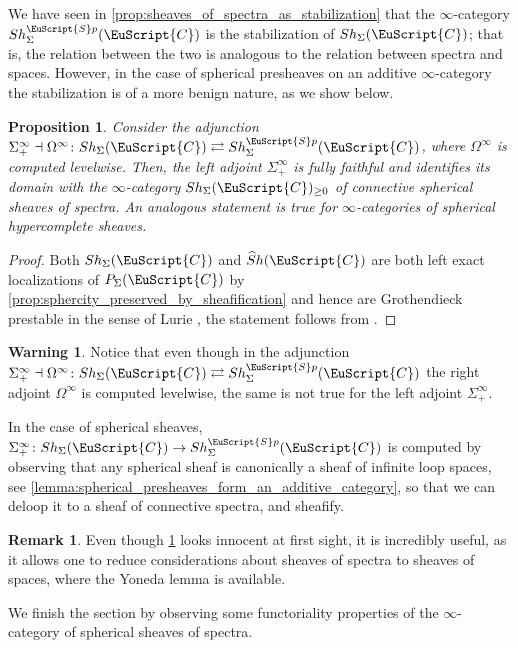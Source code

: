 \documentclass[oneside,a4paper]{amsart}
\newcommand{\euscr}[1]{\EuScript{#1}} %
\newcommand{\ccat}{\euscr{C}} %
\newcommand{\spectra}{\euscr{S}p} %
\newcommand{\hpsheaves}{\widehat{S}h} %
\newcommand{\sigmainfty}{\Sigma^{\infty}_{+}} %
\newcommand{\omegainfty}{\Omega^{\infty}} %
\theoremstyle{plain}
\newtheorem{prop}[thm]{Proposition}
\theoremstyle{definition}
\newtheorem{warning}[thm]{Warning}
\newtheorem{rem}[thm]{Remark}
\theoremstyle{remark}
\begin{document}
We have seen in \cref{prop:sheaves_of_spectra_as_stabilization} that the $\infty$-category $Sh_{\Sigma}^{\spectra}(\ccat)$ is the stabilization of $Sh_{\Sigma}(\ccat)$; that is, the relation between the two is analogous to the relation between spectra and spaces. However, in the case of spherical presheaves on an additive $\infty$-category the stabilization is of a more benign nature, as we show below.

\begin{prop}
\label{prop:spherical_sheaves_canonically_lift_to_sheaves_of_spectra}
Consider the adjunction $\sigmainfty \dashv \omegainfty \colon Sh_{\Sigma}(\ccat) \rightleftarrows Sh_{\Sigma}^{\spectra}(\ccat)$, where $\omegainfty$ is computed levelwise. Then, the left adjoint $\sigmainfty$ is fully faithful and identifies its domain with the $\infty$-category $Sh_{\Sigma}(\ccat)_{\geq 0}$ of connective spherical sheaves of spectra. An analogous statement is true for $\infty$-categories of spherical hypercomplete sheaves. 
\end{prop}

\begin{proof}
Both $Sh_{\Sigma}(\ccat)$ and $\hpsheaves(\ccat)$ are both left exact localizations of $P_{\Sigma}(\ccat)$ by \cref{prop:sphercity_preserved_by_sheafification} and hence are Grothendieck prestable in the sense of Lurie \cite[C.1.5.7, C.2.3.1]{lurie_spectral_algebraic_geometry}, the statement follows from \cite[C.1.2.10]{lurie_spectral_algebraic_geometry}. 
\end{proof}

\begin{warning}
\label{warning:sigma_infty_plus_not_computed_by_levelwise_sigma_infty}
Notice that even though in the adjunction $\sigmainfty \dashv \omegainfty \colon Sh_{\Sigma}(\ccat) \rightleftarrows Sh_{\Sigma}^{\spectra}(\ccat)$ the right adjoint $\omegainfty$ is computed levelwise, the same is not true for the left adjoint $\sigmainfty$.

In the case of spherical sheaves, $\sigmainfty \colon Sh_{\Sigma}(\ccat) \rightarrow Sh_{\Sigma}^{\spectra}(\ccat)$ is computed by observing that any spherical sheaf is canonically a sheaf of infinite loop spaces, see \cref{lemma:spherical_presheaves_form_an_additive_category}, so that we can deloop it to a sheaf of connective spectra, and sheafify.
\end{warning}

\begin{rem}
Even though \cref{prop:spherical_sheaves_canonically_lift_to_sheaves_of_spectra} looks innocent at first sight, it is incredibly useful, as it allows one to reduce considerations about sheaves of spectra to sheaves of spaces, where the Yoneda lemma is available.
\end{rem}
We finish the section by observing some functoriality properties of the $\infty$-category of spherical sheaves of spectra. 
\end{document}
